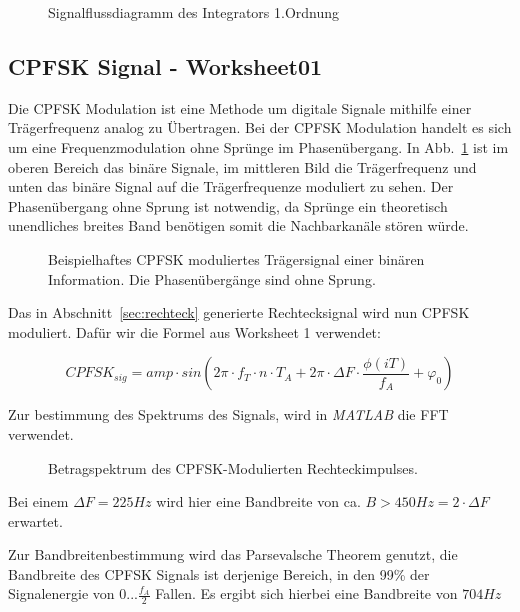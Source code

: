 \documentclass{article}
\begin{document}
\begin{figure}[!h]
    \centering
    \def\svgscale{0.3}
    \caption{Signalflussdiagramm des Integrators 1.Ordnung}
\end{figure}

\subsection{\ac{CPFSK} Signal - Worksheet01}

Die \ac{CPFSK} Modulation ist eine Methode um digitale Signale mithilfe einer Trägerfrequenz analog zu Übertragen.
Bei der \ac{CPFSK} Modulation handelt es sich um eine Frequenzmodulation ohne Sprünge im Phasenübergang. In Abb.~\ref{fsk}
ist im oberen Bereich das binäre Signale, im mittleren Bild die Trägerfrequenz und unten das binäre Signal auf die Trägerfrequenze
moduliert zu sehen. Der Phasenübergang ohne Sprung ist notwendig, da Sprünge ein theoretisch unendliches breites Band benötigen
somit die Nachbarkanäle stören würde.
\begin{figure}[!h]
    \centering

    \def\svgwidth{0.6\columnwidth}
    \caption{Beispielhaftes \ac{CPFSK} moduliertes Trägersignal einer binären 
    Information. Die Phasenübergänge sind ohne Sprung. }%
    \label{fsk}
\end{figure}

Das in Abschnitt~\ref{sec:rechteck} generierte Rechtecksignal wird nun \ac{CPFSK} moduliert.
Dafür wir die Formel aus Worksheet 1 verwendet:

$$CPFSK_{sig} = amp \cdot  sin(2  \pi \cdot f_T \cdot n \cdot T_A + 2 \pi \cdot \varDelta{F} \cdot \frac{\phi (iT)}{f_A} + \varphi_0) $$

Zur bestimmung des Spektrums des Signals, wird in \textit{MATLAB} die FFT verwendet.
\begin{figure}[!h]
    \centering
    \def\svgscale{0.3}
    \def\svgwidth{\columnwidth}
%    
    \caption{Betragspektrum des \ac{CPFSK}-Modulierten Rechteckimpulses.}
\end{figure}
Bei einem $\varDelta F = 225Hz$ wird hier eine Bandbreite von ca. $B > 450Hz = 2\cdot \varDelta F $ erwartet.

Zur Bandbreitenbestimmung wird das Parsevalsche Theorem genutzt, die Bandbreite des \ac{CPFSK} Signals ist derjenige Bereich,
in den 99\% der Signalenergie von $0...\frac{f_A}{2}$ Fallen. Es ergibt sich hierbei eine Bandbreite von $704Hz$
\end{document}
